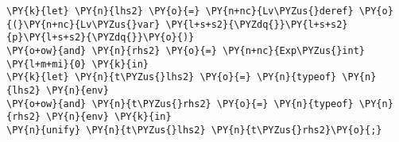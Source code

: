 \begin{Verbatim}[commandchars=\\\{\}]
\PY{k}{let} \PY{n}{lhs2} \PY{o}{=} \PY{n+nc}{Lv\PYZus{}deref} \PY{o}{(}\PY{n+nc}{Lv\PYZus{}var} \PY{l+s+s2}{\PYZdq{}}\PY{l+s+s2}{p}\PY{l+s+s2}{\PYZdq{}}\PY{o}{)}
\PY{o+ow}{and} \PY{n}{rhs2} \PY{o}{=} \PY{n+nc}{Exp\PYZus{}int} \PY{l+m+mi}{0} \PY{k}{in}
\PY{k}{let} \PY{n}{t\PYZus{}lhs2} \PY{o}{=} \PY{n}{typeof} \PY{n}{lhs2} \PY{n}{env}
\PY{o+ow}{and} \PY{n}{t\PYZus{}rhs2} \PY{o}{=} \PY{n}{typeof} \PY{n}{rhs2} \PY{n}{env} \PY{k}{in}
\PY{n}{unify} \PY{n}{t\PYZus{}lhs2} \PY{n}{t\PYZus{}rhs2}\PY{o}{;}
\end{Verbatim}
